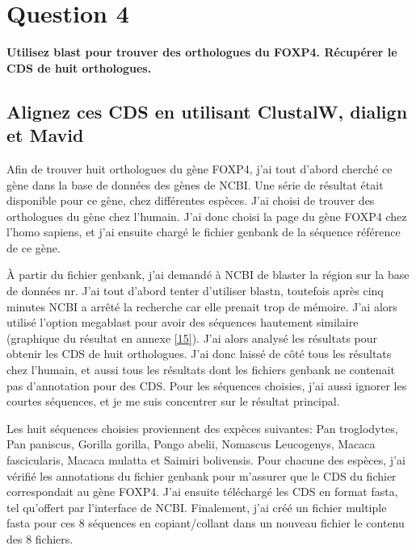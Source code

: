 \documentclass[11pt]{article} %
\begin{document}
 
\section{Question 4} %

{\bf Utilisez blast pour trouver des orthologues du FOXP4. Récupérer le CDS de huit orthologues.}

\subsection[Alignement multiple]{Alignez ces CDS en utilisant ClustalW, dialign et Mavid}

Afin de trouver huit orthologues du gène FOXP4, j'ai tout d'abord cherché ce gène dans la base de données des
gènes de NCBI. Une série de résultat était disponible pour ce gène, chez différentes espèces. J'ai choisi de
trouver des orthologues du gène chez l'humain. J'ai donc choisi la page du gène FOXP4 chez l'homo sapiens,
et j'ai ensuite chargé le fichier genbank de la séquence référence de ce gène.

À partir du fichier genbank, j'ai demandé à NCBI de blaster la région sur la base de données nr. J'ai tout
d'abord tenter d'utiliser blastn, toutefois après cinq minutes NCBI a arrêté la recherche car elle prenait
trop de mémoire. J'ai alors utilisé l'option megablast pour avoir des séquences hautement similaire
(graphique du résultat en annexe \ref{15}). J'ai alors analysé les résultats pour obtenir les CDS de huit 
orthologues. J'ai donc laissé de côté tous les résultats chez l'humain, et aussi tous les résultats dont
les fichiers genbank ne contenait pas d'annotation pour des CDS. Pour les séquences choisies, j'ai aussi
ignorer les courtes séquences, et je me suis concentrer sur le résultat principal.

Les huit séquences choisies proviennent des expèces suivantes: Pan troglodytes, Pan paniscus, Gorilla gorilla,
Pongo abelii, Nomascus Leucogenys, Macaca fascicularis, Macaca mulatta et Saimiri bolivensis. Pour chacune
des espèces, j'ai vérifié les annotations du fichier genbank pour m'assurer que le CDS du fichier correspondait
au gène FOXP4. J'ai ensuite téléchargé les CDS en format fasta, tel qu'offert par l'interface de NCBI.
Finalement, j'ai créé un fichier multiple fasta pour ces 8 séquences en copiant/collant dans un nouveau fichier
le contenu des 8 fichiers.
\end{document}
